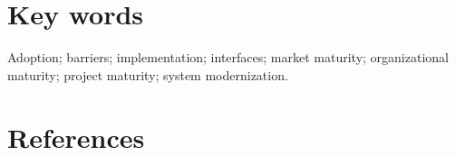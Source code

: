 \documentclass[11pt,fullpage]{article}
\begin{document}


\section*{Key words}
\normalsize 

Adoption; barriers; implementation; interfaces; market maturity;
organizational maturity; project maturity; system modernization.\\






\clearpage





\clearpage






















\clearpage






\section*{References}




\appendix






\listoftodos
\end{document}

